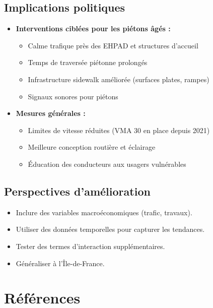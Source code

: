 \documentclass[12pt,a4paper]{article}
\begin{document}
\subsection{Implications politiques}

\begin{itemize}
  \item \textbf{Interventions ciblées pour les piétons \^{a}gés :}
        \begin{itemize}
          \item Calme trafique pr\`{e}s des EHPAD et structures d'accueil
          \item Temps de travers\'{e}e pi\'{e}tonne prolong\'{e}s
          \item Infrastructure sidewalk améliorée (surfaces plates, rampes)
          \item Signaux sonores pour piétons
        \end{itemize}
  \item \textbf{Mesures g\'{e}n\'{e}rales :}
        \begin{itemize}
          \item Limites de vitesse r\'{e}duites (VMA 30 en place depuis 2021)
          \item Meilleure conception routière et éclairage
          \item Éducation des conducteurs aux usagers vulnérables
        \end{itemize}
\end{itemize}

\subsection{Perspectives d'amélioration}

\begin{itemize}
  \item Inclure des variables macroéconomiques (trafic, travaux).
  \item Utiliser des données temporelles pour capturer les tendances.
  \item Tester des termes d'interaction supplémentaires.
  \item Généraliser à l'\^{I}le-de-France.
\end{itemize}


\section*{Références}
\end{document}
